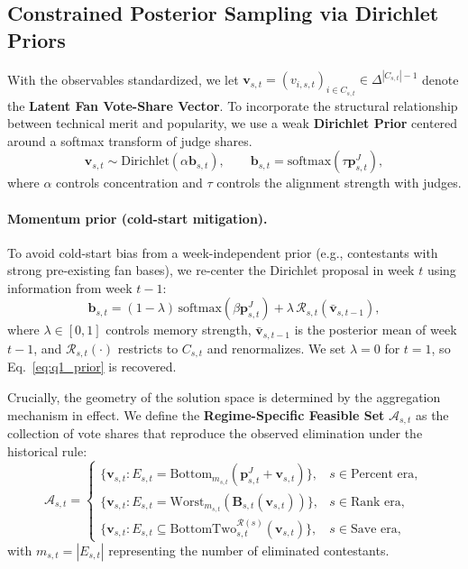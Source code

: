 \subsection{Constrained Posterior Sampling via Dirichlet Priors }
\label{sec:q1_model}

With the observables standardized, we let $\mathbf{v}_{s,t}=(v_{i,s,t})_{i\in C_{s,t}}\in\Delta^{|C_{s,t}|-1}$ denote the \textbf{Latent Fan Vote-Share Vector}. To incorporate the structural relationship between technical merit and popularity, we use a weak \textbf{Dirichlet Prior} centered around a softmax transform of judge shares.
\begin{equation}
\mathbf{v}_{s,t}\sim\mathrm{Dirichlet}(\alpha \mathbf{b}_{s,t}),\qquad 
\mathbf{b}_{s,t}=\mathrm{softmax}(\tau\mathbf{p}^{J}_{s,t}),
\label{eq:q1_prior}
\end{equation}
where $\alpha$ controls concentration and $\tau$ controls the alignment strength with judges.

\paragraph{Momentum prior (cold-start mitigation).}
To avoid cold-start bias from a week-independent prior (e.g., contestants with strong pre-existing fan bases), we re-center the Dirichlet proposal in week $t$ using information from week $t-1$:
\begin{equation}
\mathbf{b}_{s,t}=(1-\lambda)\,\mathrm{softmax}(\beta \mathbf{p}^{J}_{s,t})+\lambda\,\mathcal R_{s,t}(\bar{\mathbf{v}}_{s,t-1}),
\label{eq:q1_momentum_prior}
\end{equation}
where $\lambda\in[0,1]$ controls memory strength, $\bar{\mathbf{v}}_{s,t-1}$ is the posterior mean of week $t-1$, and $\mathcal R_{s,t}(\cdot)$ restricts to $C_{s,t}$ and renormalizes. We set $\lambda=0$ for $t=1$, so Eq.~\eqref{eq:q1_prior} is recovered.


Crucially, the geometry of the solution space is determined by the aggregation mechanism in effect. We define the \textbf{Regime-Specific Feasible Set} $\mathcal{A}_{s,t}$ as the collection of vote shares that reproduce the observed elimination under the historical rule:
\begin{equation}
\mathcal{A}_{s,t}=
\begin{cases}
\{\mathbf{v}_{s,t}:E_{s,t}=\mathrm{Bottom}_{m_{s,t}}(\mathbf{p}^{J}_{s,t}+\mathbf{v}_{s,t})\}, & s\in \text{Percent era},\\
\{\mathbf{v}_{s,t}:E_{s,t}= \mathrm{Worst}_{m_{s,t}}(\mathbf{B}_{s,t}(\mathbf{v}_{s,t}))\}, & s\in \text{Rank era},\\
\{\mathbf{v}_{s,t}:E_{s,t}\subseteq \mathrm{BottomTwo}_{s,t}^{\mathcal{R}(s)}(\mathbf{v}_{s,t})\}, & s\in \text{Save era},
\end{cases}
\label{eq:q1_regimes}
\end{equation}
with $m_{s,t}=|E_{s,t}|$ representing the number of eliminated contestants.


